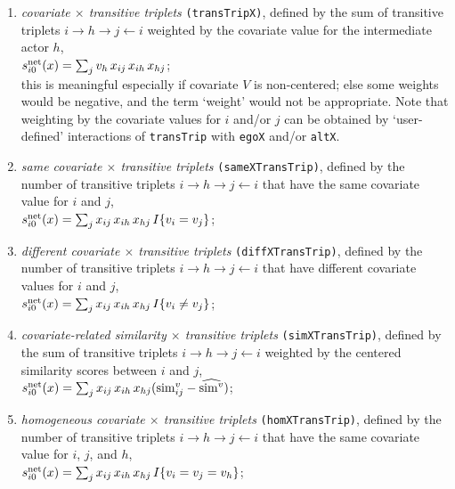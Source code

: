 \documentclass[a4paper,fleqn,11pt]{article}
\newcommand{\+}{\, + \,}
\newcommand{\vit}{\theenumi}
\begin{document}
\begin{enumerate}
 \item {\em covariate $\times$ transitive triplets}
 \texttt{(transTripX)}, defined by the sum of transitive triplets
 $i \rightarrow h \rightarrow j \leftarrow i$
 weighted by the covariate value for the intermediate actor $h$,\\
 $s^{\rm net}_{i\vit}(x) =
 \sum_j v_h \, x_{ij}\, x_{ih} \, x_{hj} $;\\
 this is meaningful especially if covariate $V$ is non-centered;
 else some weights would be negative, and the term `weight'
 would not be appropriate.
 Note that weighting by the covariate values for $i$ and/or $j$
 can be obtained by `user-defined' interactions of \texttt{transTrip}
 with \texttt{egoX} and/or \texttt{altX}.


 \item {\em same covariate $\times$ transitive triplets}
 \texttt{(sameXTransTrip)}, defined by the number of transitive triplets
 $i \rightarrow h \rightarrow j \leftarrow i$
 that have the same covariate value for $i$ and $j$,\\
 $s^{\rm net}_{i\vit}(x) =
 \sum_j x_{ij}\, x_{ih} \, x_{hj} \, I\{v_i = v_j\}$;

 \item {\em different covariate $\times$ transitive triplets}
 \texttt{(diffXTransTrip)}, defined by the number of transitive triplets
 $i \rightarrow h \rightarrow j \leftarrow i$
 that have different covariate values for $i$ and $j$,\\
 $s^{\rm net}_{i\vit}(x) =
 \sum_j x_{ij}\, x_{ih} \, x_{hj} \, I\{v_i \neq v_j\}$;


 \item {\em covariate-related similarity $\times$ transitive triplets}
 \texttt{(simXTransTrip)}, defined by the sum of transitive triplets
 $i \rightarrow h \rightarrow j \leftarrow i$
 weighted by the centered similarity scores between $i$ and $j$,\\
 $s^{\rm net}_{i\vit}(x) = \sum_j x_{ij}\, x_{ih} \, x_{hj}
         ({\rm sim}^v_{ij} - \widehat{{\rm sim}^v}) $;

 \item {\em homogeneous covariate $\times$ transitive triplets}
 \texttt{(homXTransTrip)}, defined by the number of transitive triplets
 $i \rightarrow h \rightarrow j \leftarrow i$
 that have the same covariate value for $i$, $j$, and $h$,\\
 $s^{\rm net}_{i\vit}(x) =
 \sum_j x_{ij}\, x_{ih} \, x_{hj} \, I\{v_i = v_j = v_h\}$;


\end{enumerate}
\end{document}
